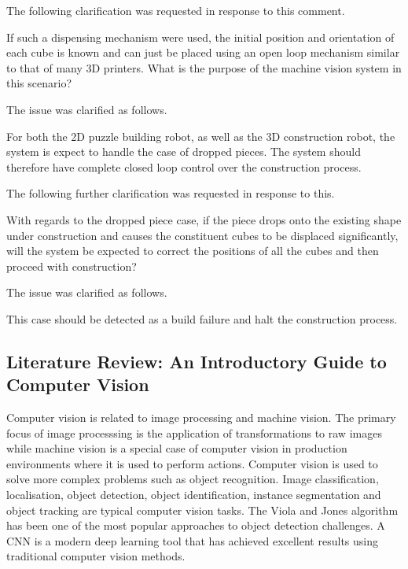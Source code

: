 The following clarification was requested in response to this comment.

\begin{slantnote}
If such a dispensing mechanism were used, the initial position and orientation of each cube is known and can just be placed using an open loop mechanism similar to that of many 3D printers. What is the purpose of the machine vision system in this scenario?
\end{slantnote}

The issue was clarified as follows.

\begin{slantnote}
For both the 2D puzzle building robot, as well as the 3D construction robot, the system is expect to handle the case of dropped pieces. The system should therefore have complete closed loop control over the construction process.
\end{slantnote}

The following further clarification was requested in response to this.

\begin{slantnote}
With regards to the dropped piece case, if the piece drops onto the existing shape under construction and causes the constituent cubes to be displaced significantly, will the system be expected to correct the positions of all the cubes and then proceed with construction?
\end{slantnote}

The issue was clarified as follows.

\begin{slantnote}
This case should be detected as a build failure and halt the construction process.
\end{slantnote}

\subsection{Literature Review: An Introductory Guide to Computer Vision \cite{tryolabs_resources_2019}}

Computer vision is related to image processing and machine vision. The primary focus of image processsing is the application of transformations to raw images while machine vision is a special case of computer vision in production environments where it is used to perform actions. Computer vision is used to solve more complex problems such as object recognition. Image classification, localisation, object detection, object identification, instance segmentation and object tracking are typical computer vision tasks. The Viola and Jones algorithm has been one of the most popular approaches to object detection challenges. A \ac{CNN} is a modern deep learning tool that has achieved excellent results using traditional computer vision methods.

